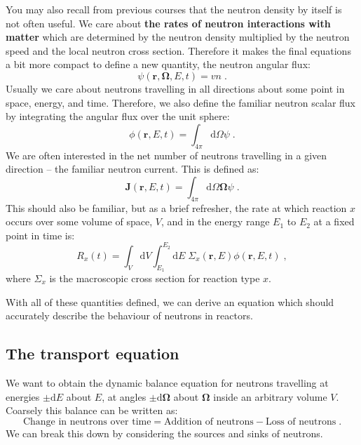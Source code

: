 \documentclass{article}
\begin{document}
You may also recall from previous courses that the neutron density by itself is not often useful. We care about \textbf{the rates of neutron interactions with matter} which are determined by the neutron density multiplied by the neutron speed and the local neutron cross section. Therefore it makes the final equations a bit more compact to define a new quantity, the neutron angular flux:
\begin{equation}
    \psi(\mathbf{r},\mathbf{\Omega},E,t) = vn\; \mathrm{.}
\end{equation} 
Usually we care about neutrons travelling in all directions about some point in space, energy, and time. Therefore, we also define the familiar neutron scalar flux by integrating the angular flux over the unit sphere:
\begin{equation}
    \phi(\mathbf{r},E,t) = \int_{4\pi}\mathrm{d}\Omega \psi \;\mathrm{.} 
\end{equation}
We are often interested in the net number of neutrons travelling in a given direction -- the familiar neutron current. This is defined as:
\begin{equation}
    \mathbf{J}(\mathbf{r},E,t) = \int_{4\pi}\mathrm{d}\Omega\mathbf{\Omega}\psi\;\mathrm{.}
\end{equation}
This should also be familiar, but as a brief refresher, the rate at which reaction $x$ occurs over some volume of space, $V$, and in the energy range $E_1$ to $E_2$ at a fixed point in time is:
\begin{equation}\label{eq:reaction}
    R_x(t) = \int_V \mathrm{d}V \int^{E_2}_{E_1} \mathrm{d}E\; \Sigma_x(\mathbf{r},E) \phi(\mathbf{r},E,t) \;\mathrm{,}
\end{equation}
where $\Sigma_x$ is the macroscopic cross section for reaction type $x$.

With all of these quantities defined, we can derive an equation which should accurately describe the behaviour of neutrons in reactors.

\subsection{The transport equation}

We want to obtain the dynamic balance equation for neutrons travelling at energies $\pm \mathrm{d}E$ about $E$, at angles $\pm \mathrm{d}\mathbf{\Omega}$ about $\mathbf{\Omega}$ inside an arbitrary volume $V$. Coarsely this balance can be written as:
\begin{equation}\label{eq:balance_words}
    \textrm{Change in neutrons over time} = \textrm{Addition of neutrons} - \textrm{Loss of neutrons}\;\mathrm{.} 
\end{equation}
We can break this down by considering the sources and sinks of neutrons.
\end{document}
